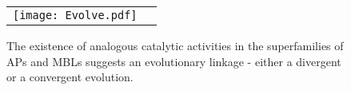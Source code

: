 
\begin{figure}[t]
\begin{center}
\begin{tabular}{cc}
    \texttt{[image: Evolve.pdf]}
\end{tabular}
\end{center}
\caption { The existence of analogous catalytic activities in the superfamilies of APs and MBLs suggests an evolutionary linkage - either a divergent or a convergent evolution. 
} \label{fig:evolve}
\end{figure}
